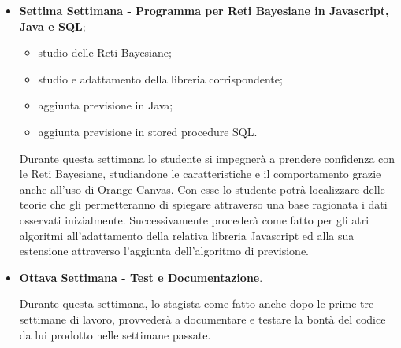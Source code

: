\begin{itemize}
	\item \textbf{Settima Settimana - Programma per Reti Bayesiane in Javascript, Java e SQL};
\begin{itemize}
	\item studio delle Reti Bayesiane;
	\item studio e adattamento della libreria corrispondente;
	\item aggiunta previsione in Java;
	\item aggiunta previsione in stored procedure SQL.
	\end{itemize}
	Durante questa settimana lo studente si impegnerà a prendere confidenza con le Reti Bayesiane, studiandone le caratteristiche e il comportamento grazie anche all'uso di Orange Canvas. Con esse lo studente potrà localizzare delle teorie che gli permetteranno di spiegare attraverso una base ragionata i dati osservati inizialmente. Successivamente procederà come fatto per gli atri algoritmi all'adattamento della relativa libreria Javascript ed alla sua estensione attraverso l'aggiunta dell'algoritmo di previsione.
	
	\item \textbf{Ottava Settimana - Test e Documentazione}.
	 \par Durante questa settimana, lo stagista come fatto anche dopo le prime tre settimane di lavoro, provvederà a documentare e testare la bontà del codice da lui prodotto nelle settimane passate.

\end{itemize}
